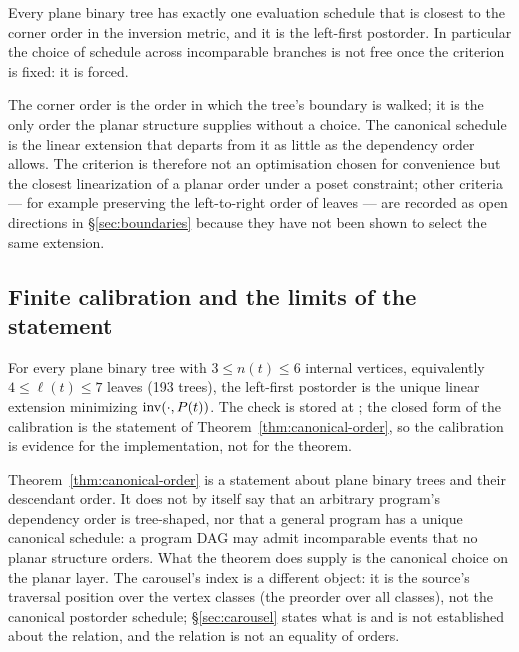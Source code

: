 \begin{corollary}\label{cor:canonical-schedule}
Every plane binary tree has exactly one evaluation schedule that is closest to the
corner order in the inversion metric, and it is the left-first postorder.  In
particular the choice of schedule across incomparable branches is not free once the
criterion is fixed: it is forced.
\end{corollary}

\begin{remark}\label{rem:why-criterion}
The corner order is the order in which the tree's boundary is walked; it is the only
order the planar structure supplies without a choice.  The canonical schedule is the
linear extension that departs from it as little as the dependency order allows.  The
criterion is therefore not an optimisation chosen for convenience but the closest
linearization of a planar order under a poset constraint; other criteria --- for
example preserving the left-to-right order of leaves --- are recorded as open
directions in \S\ref{sec:boundaries} because they have not been shown to select the
same extension.
\end{remark}

\subsection{Finite calibration and the limits of the statement}

\begin{calibration}\label{cal:canonical-order}
For every plane binary tree with $3\le n(t)\le 6$ internal vertices, equivalently
$4\le \ell(t)\le 7$ leaves (193 trees), the left-first postorder is
the unique linear extension minimizing $\operatorname{inv}(\cdot,P(t))$.  The check is stored at
; the closed form of the
calibration is the statement of Theorem~\ref{thm:canonical-order}, so the calibration
is evidence for the implementation, not for the theorem.
\end{calibration}

Theorem~\ref{thm:canonical-order} is a statement about plane binary trees and their
descendant order.  It does not by itself say that an arbitrary program's dependency
order is tree-shaped, nor that a general program has a unique canonical schedule: a
program DAG may admit incomparable events that no planar structure orders.  What the
theorem does supply is the canonical choice on the planar layer.  The carousel's index
is a different object: it is the source's traversal position over the vertex classes
(the preorder over all classes), not the canonical postorder schedule;
\S\ref{sec:carousel} states what is and is not established about the relation, and the
relation is not an equality of orders.

